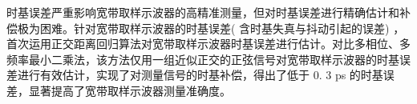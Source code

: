 
时基误差严重影响宽带取样示波器的高精准测量，但对时基误差进行精确估计和补偿极为困难。针对宽带取样示波器的时基误差( 含时基失真与抖动引起的误差) ，首次运用正交距离回归算法对宽带取样示波器时基误差进行估计。对比多相位、多频率最小二乘法，该方法仅用一组近似正交的正弦信号对宽带取样示波器的时基误差进行有效估计，实现了对测量信号的时基补偿，得出了低于 0. 3 ps 的时基误差，显著提高了宽带取样示波器测量准确度。